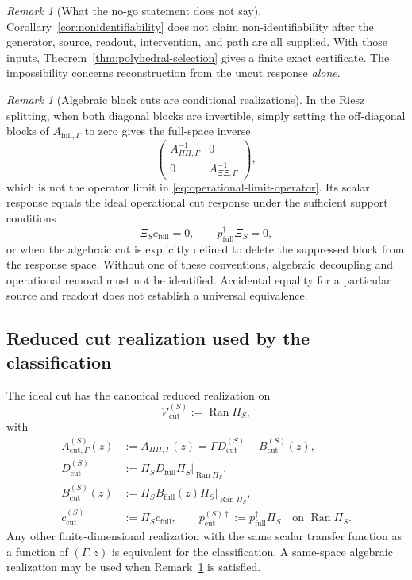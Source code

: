 \documentclass[11pt]{article}
\theoremstyle{definition}
\theoremstyle{remark}
\newtheorem{remark}[theorem]{Remark}
\theoremstyle{plain}
\newcommand{\V}{\mathcal V}
\newcommand{\Ran}{\operatorname{Ran}}
\newcommand{\full}{\mathrm{full}}
\newcommand{\cut}{\mathrm{cut}}
\begin{document}
\begin{remark}[What the no-go statement does not say]
Corollary~\ref{cor:nonidentifiability} does not claim non-identifiability after
the generator, source, readout, intervention, and path are all supplied.
With those inputs, Theorem~\ref{thm:polyhedral-selection} gives a finite exact
certificate.  The impossibility concerns reconstruction from the uncut
response \emph{alone}.
\end{remark}

\begin{remark}[Algebraic block cuts are conditional realizations]\label{rem:algebraic-operational}
In the Riesz splitting, when both diagonal blocks are invertible, simply setting the off-diagonal blocks of $A_{\full,\Gamma}$ to zero gives the full-space inverse
\[
  \begin{pmatrix}
    A_{\Pi\Pi,\Gamma}^{-1}&0\\
    0&A_{\Xi\Xi,\Gamma}^{-1}
  \end{pmatrix},
\]
which is not the operator limit in \eqref{eq:operational-limit-operator}.  Its scalar response equals the ideal operational cut response under the sufficient support conditions
\begin{equation}\label{eq:retained-support}
  \Xi_Sc_{\full}=0,
  \qquad
  p_{\full}^{\dagger}\Xi_S=0,
\end{equation}
or when the algebraic cut is explicitly defined to delete the suppressed block from the response space.  Without one of these conventions, algebraic decoupling and operational removal must not be identified.  Accidental equality for a particular source and readout does not establish a universal equivalence.
\end{remark}

\subsection{Reduced cut realization used by the classification}\label{subsec:cut-realization}
The ideal cut has the canonical reduced realization on
\[
  \V_{\cut}^{(S)}:=\Ran\Pi_S,
\]
with
\begin{align}
  A_{\cut,\Gamma}^{(S)}(z)
  &:=A_{\Pi\Pi,\Gamma}(z)
    =\Gamma D_{\cut}^{(S)}+B_{\cut}^{(S)}(z),\label{eq:cut-family}\\
  D_{\cut}^{(S)}
  &:=\Pi_SD_{\full}\Pi_S\big|_{\Ran\Pi_S},\\
  B_{\cut}^{(S)}(z)
  &:=\Pi_SB_{\full}(z)\Pi_S\big|_{\Ran\Pi_S},\\
  c_{\cut}^{(S)}&:=\Pi_Sc_{\full},
  \qquad
  p_{\cut}^{(S)\dagger}:=p_{\full}^{\dagger}\Pi_S
  \quad\text{on }\Ran\Pi_S.
\end{align}
Any other finite-dimensional realization with the same scalar transfer function as a function of $(\Gamma,z)$ is equivalent for the classification.  A same-space algebraic realization may be used when Remark~\ref{rem:algebraic-operational} is satisfied.
\end{document}
